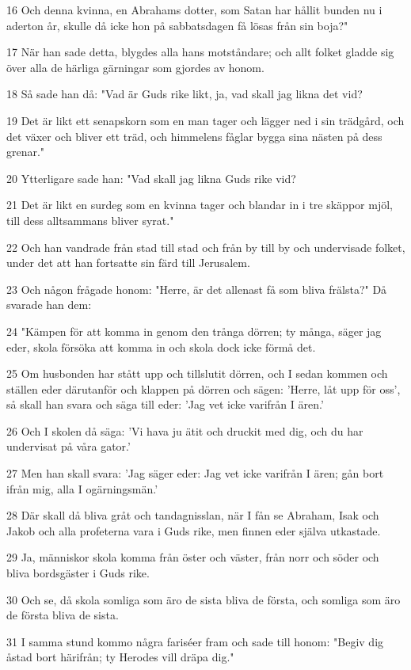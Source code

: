\par 16 Och denna kvinna, en Abrahams dotter, som Satan har hållit bunden nu i aderton år, skulle då icke hon på sabbatsdagen få lösas från sin boja?"
\par 17 När han sade detta, blygdes alla hans motståndare; och allt folket gladde sig över alla de härliga gärningar som gjordes av honom.
\par 18 Så sade han då: "Vad är Guds rike likt, ja, vad skall jag likna det vid?
\par 19 Det är likt ett senapskorn som en man tager och lägger ned i sin trädgård, och det växer och bliver ett träd, och himmelens fåglar bygga sina nästen på dess grenar."
\par 20 Ytterligare sade han: "Vad skall jag likna Guds rike vid?
\par 21 Det är likt en surdeg som en kvinna tager och blandar in i tre skäppor mjöl, till dess alltsammans bliver syrat."
\par 22 Och han vandrade från stad till stad och från by till by och undervisade folket, under det att han fortsatte sin färd till Jerusalem.
\par 23 Och någon frågade honom: "Herre, är det allenast få som bliva frälsta?" Då svarade han dem:
\par 24 "Kämpen för att komma in genom den trånga dörren; ty många, säger jag eder, skola försöka att komma in och skola dock icke förmå det.
\par 25 Om husbonden har stått upp och tillslutit dörren, och I sedan kommen och ställen eder därutanför och klappen på dörren och sägen: 'Herre, låt upp för oss', så skall han svara och säga till eder: 'Jag vet icke varifrån I ären.'
\par 26 Och I skolen då säga: 'Vi hava ju ätit och druckit med dig, och du har undervisat på våra gator.'
\par 27 Men han skall svara: 'Jag säger eder: Jag vet icke varifrån I ären; gån bort ifrån mig, alla I ogärningsmän.'
\par 28 Där skall då bliva gråt och tandagnisslan, när I fån se Abraham, Isak och Jakob och alla profeterna vara i Guds rike, men finnen eder själva utkastade.
\par 29 Ja, människor skola komma från öster och väster, från norr och söder och bliva bordsgäster i Guds rike.
\par 30 Och se, då skola somliga som äro de sista bliva de första, och somliga som äro de första bliva de sista.
\par 31 I samma stund kommo några fariséer fram och sade till honom: "Begiv dig åstad bort härifrån; ty Herodes vill dräpa dig."
